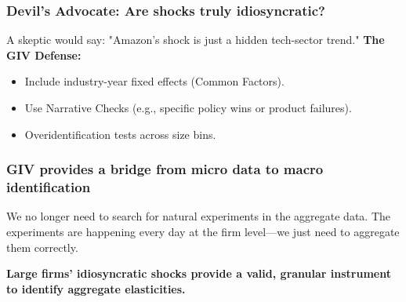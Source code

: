 \documentclass[aspectratio=169,11pt]{beamer}
\begin{document}
\begin{frame}
    \frametitle{Devil's Advocate: Are shocks truly idiosyncratic?}
    \vspace{0.5cm}
    {\Large
        A skeptic would say: "Amazon's shock is just a hidden tech-sector trend."
    }
    \vspace{1cm}
    \textbf{The GIV Defense:}
    \begin{itemize}
        \item Include industry-year fixed effects (Common Factors).
        \item Use Narrative Checks (e.g., specific policy wins or product failures).
        \item Overidentification tests across size bins.
    \end{itemize}
\end{frame}


\begin{frame}
    \frametitle{GIV provides a bridge from micro data to macro identification}
    \vspace{1cm}
    {\Large
        We no longer need to search for natural experiments in the aggregate data.
    }
    \vspace{1cm}
    {\Large
        The experiments are happening every day at the firm level—we just need to aggregate them correctly.
    }
\end{frame}

\begin{frame}[plain]
    \vfill
    \begin{center}
        {\huge\bfseries\textcolor{DeepNavy}{Large firms' idiosyncratic shocks provide a valid, granular instrument to identify aggregate elasticities.}}
    \end{center}
    \vfill
\end{frame}
\end{document}
